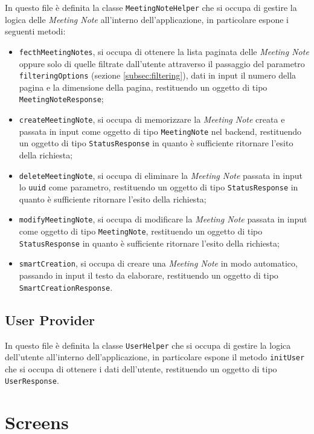 In questo file è definita la classe \lstinline{MeetingNoteHelper} che si occupa di gestire la logica delle \emph{Meeting Note} all'interno dell'applicazione, in particolare espone i seguenti metodi:
\begin{itemize}
    \item \lstinline{fecthMeetingNotes}, si occupa di ottenere la lista paginata delle \emph{Meeting Note} oppure solo di quelle filtrate dall'utente attraverso il passaggio del parametro \lstinline{filteringOptions} (sezione \ref{subsec:filtering}), dati in input il numero della pagina e la dimensione della pagina, restituendo un oggetto di tipo \lstinline{MeetingNoteResponse};
    \item \lstinline{createMeetingNote}, si occupa di memorizzare la \emph{Meeting Note} creata e passata in input come oggetto di tipo \lstinline{MeetingNote} nel \gls{backend}\glsoccur, restituendo un oggetto di tipo \lstinline{StatusResponse} in quanto è sufficiente ritornare l'esito della richiesta;
    \item \lstinline{deleteMeetingNote}, si occupa di eliminare la \emph{Meeting Note} passata in input lo \lstinline{uuid} come parametro, restituendo un oggetto di tipo \lstinline{StatusResponse} in quanto è sufficiente ritornare l'esito della richiesta;
    \item \lstinline{modifyMeetingNote}, si occupa di modificare la \emph{Meeting Note} passata in input come oggetto di tipo \lstinline{MeetingNote}, restituendo un oggetto di tipo \lstinline{StatusResponse} in quanto è sufficiente ritornare l'esito della richiesta;
    \item \lstinline{smartCreation}, si occupa di creare una \emph{Meeting Note} in modo automatico, passando in input il testo da elaborare, restituendo un oggetto di tipo \lstinline{SmartCreationResponse}.
\end{itemize}

\subsection{User Provider}
\label{subsec:user-provider}

In questo file è definita la classe \lstinline{UserHelper} che si occupa di gestire la logica dell'utente all'interno dell'applicazione, in particolare espone il metodo \lstinline{initUser} che si occupa di ottenere i dati dell'utente, restituendo un oggetto di tipo \lstinline{UserResponse}.

\section{Screens}
\label{sec:screens}

